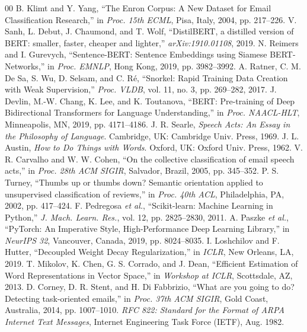 \documentclass[conference]{IEEEtran}
\begin{document}
\begin{thebibliography}{00}
 B. Klimt and Y. Yang, ``The Enron Corpus: A New Dataset for Email Classification Research,'' in \textit{Proc. 15th ECML}, Pisa, Italy, 2004, pp. 217--226.
 V. Sanh, L. Debut, J. Chaumond, and T. Wolf, ``DistilBERT, a distilled version of BERT: smaller, faster, cheaper and lighter,'' \textit{arXiv:1910.01108}, 2019.
 N. Reimers and I. Gurevych, ``Sentence-BERT: Sentence Embeddings using Siamese BERT-Networks,'' in \textit{Proc. EMNLP}, Hong Kong, 2019, pp. 3982--3992.
 A. Ratner, C. M. De Sa, S. Wu, D. Selsam, and C. R{\'e}, ``Snorkel: Rapid Training Data Creation with Weak Supervision,'' \textit{Proc. VLDB}, vol. 11, no. 3, pp. 269--282, 2017.
 J. Devlin, M.-W. Chang, K. Lee, and K. Toutanova, ``BERT: Pre-training of Deep Bidirectional Transformers for Language Understanding,'' in \textit{Proc. NAACL-HLT}, Minneapolis, MN, 2019, pp. 4171--4186.
 J. R. Searle, \textit{Speech Acts: An Essay in the Philosophy of Language}. Cambridge, UK: Cambridge Univ. Press, 1969.
 J. L. Austin, \textit{How to Do Things with Words}. Oxford, UK: Oxford Univ. Press, 1962.
 V. R. Carvalho and W. W. Cohen, ``On the collective classification of email speech acts,'' in \textit{Proc. 28th ACM SIGIR}, Salvador, Brazil, 2005, pp. 345--352.
 P. S. Turney, ``Thumbs up or thumbs down? Semantic orientation applied to unsupervised classification of reviews,'' in \textit{Proc. 40th ACL}, Philadelphia, PA, 2002, pp. 417--424.
 F. Pedregosa \textit{et al.}, ``Scikit-learn: Machine Learning in Python,'' \textit{J. Mach. Learn. Res.}, vol. 12, pp. 2825--2830, 2011.
 A. Paszke \textit{et al.}, ``PyTorch: An Imperative Style, High-Performance Deep Learning Library,'' in \textit{NeurIPS 32}, Vancouver, Canada, 2019, pp. 8024--8035.
 I. Loshchilov and F. Hutter, ``Decoupled Weight Decay Regularization,'' in \textit{ICLR}, New Orleans, LA, 2019.
 T. Mikolov, K. Chen, G. S. Corrado, and J. Dean, ``Efficient Estimation of Word Representations in Vector Space,'' in \textit{Workshop at ICLR}, Scottsdale, AZ, 2013.
 D. Corney, D. R. Stent, and H. Di Fabbrizio, ``What are you going to do? Detecting task-oriented emails,'' in \textit{Proc. 37th ACM SIGIR}, Gold Coast, Australia, 2014, pp. 1007--1010.
 \textit{RFC 822: Standard for the Format of ARPA Internet Text Messages}, Internet Engineering Task Force (IETF), Aug. 1982.
\end{thebibliography}
\end{document}
